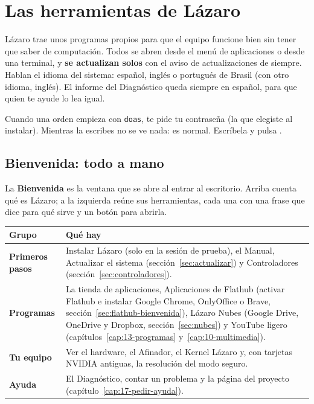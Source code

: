 \chapter{Las herramientas de Lázaro}\label{cap:15-herramientas}

Lázaro trae unos programas propios para que el equipo funcione bien sin
tener que saber de computación. Todos se abren desde el menú de
aplicaciones o desde una terminal, y \textbf{se actualizan solos} con el
aviso de actualizaciones de siempre. Hablan el idioma del sistema:
español, inglés o portugués de Brasil (con otro idioma, inglés). El
informe del Diagnóstico queda siempre en español, para que quien te
ayude lo lea igual.

\begin{nota}
Cuando una orden empieza con \texttt{doas}, te pide tu contraseña (la que
elegiste al instalar). Mientras la escribes no se ve nada: es normal.
Escríbela y pulsa .
\end{nota}

\section{Bienvenida: todo a mano}\label{sec:bienvenida}

La \textbf{Bienvenida} es la ventana que se abre al entrar al escritorio.
Arriba cuenta qué es Lázaro; a la izquierda reúne sus herramientas, cada
una con una frase que dice para qué sirve y un botón para abrirla.


\begin{center}
\begin{tabularx}{\textwidth}{>{\bfseries}lX}
\toprule
Grupo & Qué hay \\
\midrule
Primeros pasos & Instalar Lázaro (solo en la sesión de prueba), el Manual,
  Actualizar el sistema (sección~\ref{sec:actualizar}) y Controladores
  (sección~\ref{sec:controladores}). \\
Programas & La tienda de aplicaciones, Aplicaciones de Flathub (activar
  Flathub e instalar Google Chrome, OnlyOffice o Brave,
  sección~\ref{sec:flathub-bienvenida}), Lázaro Nubes (Google Drive,
  OneDrive y Dropbox, sección~\ref{sec:nubes}) y YouTube ligero
  (capítulos~\ref{cap:13-programas} y~\ref{cap:10-multimedia}). \\
Tu equipo & Ver el hardware, el Afinador, el Kernel Lázaro y, con
  tarjetas NVIDIA antiguas, la resolución del modo seguro. \\
Ayuda & El Diagnóstico, contar un problema y la página del proyecto
  (capítulo~\ref{cap:17-pedir-ayuda}). \\
\bottomrule
\end{tabularx}
\end{center}

